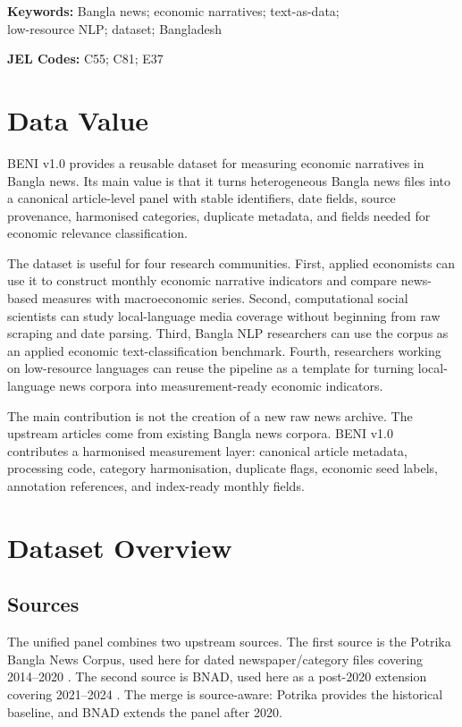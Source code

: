 \documentclass[11pt]{article}
\begin{document}
\noindent\textbf{Keywords:} Bangla news; economic narratives; text-as-data;\\
low-resource NLP; dataset; Bangladesh

\noindent\textbf{JEL Codes:} C55; C81; E37

\section{Data Value}

BENI v1.0 provides a reusable dataset for measuring economic narratives in Bangla news. Its main value is that it turns heterogeneous Bangla news files into a canonical article-level panel with stable identifiers, date fields, source provenance, harmonised categories, duplicate metadata, and fields needed for economic relevance classification.

The dataset is useful for four research communities. First, applied economists can use it to construct monthly economic narrative indicators and compare news-based measures with macroeconomic series. Second, computational social scientists can study local-language media coverage without beginning from raw scraping and date parsing. Third, Bangla NLP researchers can use the corpus as an applied economic text-classification benchmark. Fourth, researchers working on low-resource languages can reuse the pipeline as a template for turning local-language news corpora into measurement-ready economic indicators.

The main contribution is not the creation of a new raw news archive. The upstream articles come from existing Bangla news corpora. BENI v1.0 contributes a harmonised measurement layer: canonical article metadata, processing code, category harmonisation, duplicate flags, economic seed labels, annotation references, and index-ready monthly fields.

\section{Dataset Overview}

\subsection{Sources}

The unified panel combines two upstream sources. The first source is the Potrika Bangla News Corpus, used here for dated newspaper/category files covering 2014--2020 \citep{mendeley2024potrika}. The second source is BNAD, used here as a post-2020 extension covering 2021--2024 \citep{banglanewsdb}. The merge is source-aware: Potrika provides the historical baseline, and BNAD extends the panel after 2020.
\end{document}

